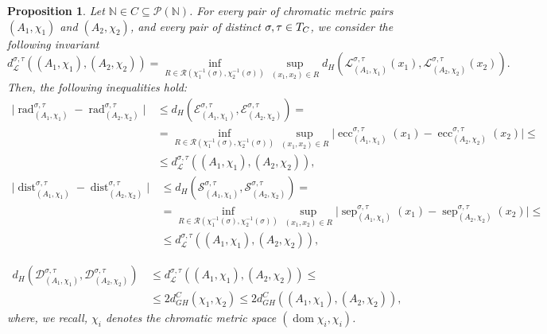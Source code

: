 \documentclass[8pt,a4paper,oneside,english,english]{article}
\theoremstyle{plain}
\theoremstyle
{plain}
\newtheorem{proposition}[theorem]{Proposition}%
\theoremstyle{definition}
\newcommand{\N}{\mathbb{N}}
\newcommand{\Tau}{\mathcal T}
\newcommand{\GH}{d_{GH}}
\newcommand{\MP}[1]{(A_{#1},\chi_{#1})}
\DeclareMathOperator{\dom}{dom}
\DeclareMathOperator{\dist}{dist}
\DeclareMathOperator{\ecc}{ecc}
\DeclareMathOperator{\rad}{rad}
\DeclareMathOperator{\sep}{sep}
\begin{document}
\begin{proposition}\label{prop:chromatic_invariants}
    Let $\N\in C\subseteq\mathcal P(\N)$. For every pair of chromatic metric pairs $\MP{1}$ and $\MP{2}$, and every pair of distinct $\sigma,\tau\in\mathcal \Tau_C$, we consider the following invariant
    \[
        d_{\mathcal{L}}^{\sigma,\tau}((A_1,\chi_1), (A_2, \chi_2))
        =
        \inf_{R\in\mathcal R(\chi_1^{-1}(\sigma),\chi_2^{-1}(\sigma))}\sup_{(x_1,x_2)\in R}d_H(\mathcal L_{\MP{1}}^{\sigma,\tau}(x_1),\mathcal L_{\MP{2}}^{\sigma,\tau}(x_2)).
    \]
    Then, the following inequalities hold:
    \begin{equation}
    \begin{aligned}
        \lvert\rad_{\MP{1}}^{\sigma,\tau}-\rad_{\MP{2}}^{\sigma,\tau}\rvert&\,
        \leq
        d_H(\mathcal E_{\MP{1}}^{\sigma,\tau},\mathcal E_{\MP{2}}^{\sigma,\tau})
        = \\
        &\,=
        \inf_{R\in\mathcal R(\chi_1^{-1}(\sigma),\chi_2^{-1}(\sigma))}\sup_{(x_1,x_2)\in R}\lvert\ecc_{\MP{1}}^{\sigma,\tau}(x_1)-\ecc_{\MP{2}}^{\sigma,\tau}(x_2)\rvert\leq \\
        &\,\leq
        d_{\mathcal{L}}^{\sigma,\tau}((A_1,\chi_1), (A_2, \chi_2)),
    \end{aligned}
    \end{equation}
    \begin{equation}
    \begin{aligned}
        \lvert\dist_{\MP{1}}^{\sigma,\tau}-\dist_{\MP{2}}^{\sigma,\tau}\rvert&\,
        \leq
        d_H(\mathcal S_{\MP{1}}^{\sigma,\tau},\mathcal S_{\MP{2}}^{\sigma,\tau})
        =\\
        &\,=
        \inf_{R\in\mathcal R(\chi_1^{-1}(\sigma),\chi_2^{-1}(\sigma))}\sup_{(x_1,x_2)\in R}\lvert\sep_{\MP{1}}^{\sigma,\tau}(x_1)-\sep_{\MP{2}}^{\sigma,\tau}(x_2)\rvert
        \leq \\
        &\,\leq
        d_{\mathcal{L}}^{\sigma,\tau}((A_1,\chi_1), (A_2, \chi_2)),
    \end{aligned}
    \end{equation}
    
    \begin{equation}\label{eq:stable_chromatic_invariants}
    \begin{aligned}
    d_H(\mathcal D_{\MP{1}}^{\sigma,\tau},\mathcal D_{\MP{2}}^{\sigma,\tau})
    &\,\leq
    d_{\mathcal{L}}^{\sigma,\tau}((A_1,\chi_1), (A_2, \chi_2))
    \leq \\
    &\,\leq
    2\GH^C(\chi_1,\chi_2)\leq 2\GH^C(\MP{1},\MP{2}),
    \end{aligned}
    \end{equation}
    where, we recall, $\chi_i$ denotes the chromatic metric space $(\dom\chi_i, \chi_i)$.
\end{proposition}
\end{document}
